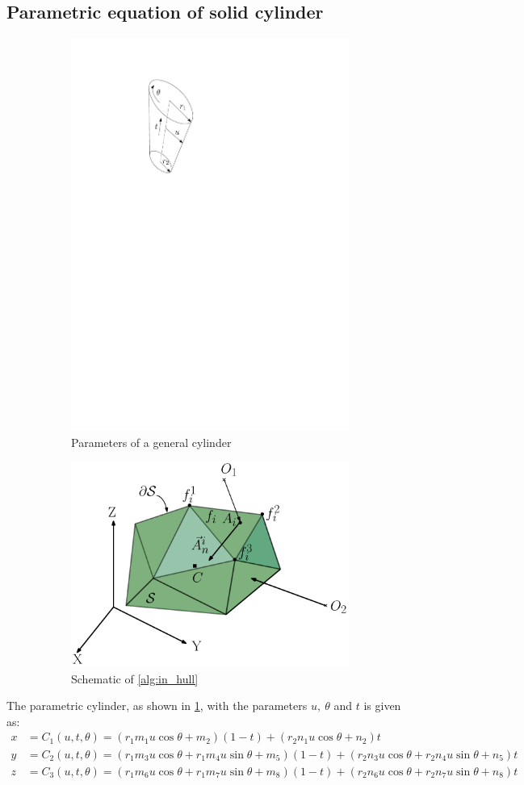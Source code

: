 \documentclass[12pt,a4]{article}
\begin{document}
\subsection{Parametric equation of solid cylinder}\label{app:parametric_u_v_solid_cyl}
\begin{figure}[ht!]
    \centering
    \begin{subfigure}{0.48\textwidth}
        \centering
        \includegraphics[width=0.3\linewidth]{figures/fig17a.pdf}
        \caption{Parameters of a general cylinder \label{fig:cylparams}}
    \end{subfigure}%
    \begin{subfigure}{0.48\textwidth}
        \centering
        \includegraphics[width=0.85\linewidth]{figures/app_fig1.pdf}
        \caption{Schematic of \cref{alg:in_hull} \label{fig:alg_schematic}}
    \end{subfigure}
\caption{}
\end{figure}
The parametric cylinder, as shown in \cref{fig:cylparams}, with the parameters $u,~\theta$ and $t$ is given as:
\begin{align}
x & = C_1(u,t,\theta)=\left(r_1m_1u\cos\theta +m_2 \right)\left(1-t \right)+\left(r_2n_1u\cos\theta+n_2 \right)t\\
y & = C_2(u,t,\theta)=\left(r_1m_3u\cos\theta +r_1m_4u\sin\theta +m_5 \right)\left(1-t \right)+\left(r_2n_3u\cos\theta+r_2n_4u\sin\theta+n_5 \right)t\\
z & = C_3(u,t,\theta)=\left(r_1m_6u\cos\theta +r_1m_7u\sin\theta +m_8 \right)\left(1-t \right)+\left(r_2n_6u\cos\theta+r_2n_7u\sin\theta+n_8 \right)t
\end{align}
\end{document}
